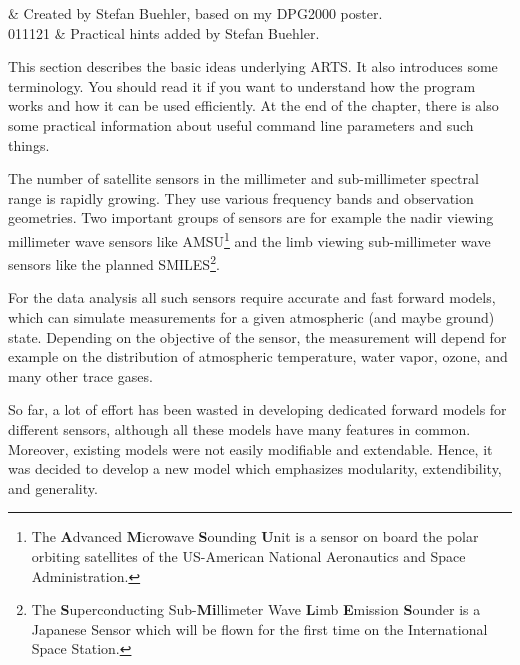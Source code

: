 %
%
 \label{sec:concept}

%
%
 & Created by Stefan Buehler, based on my DPG2000 poster.\\
  011121 & Practical hints added by Stefan Buehler.
\stophistory

%
%
%

%
%
This section describes the basic ideas underlying ARTS. It also
introduces some terminology. You should read it if you want
to understand how the program works and how it can be used
efficiently. At the end of the chapter, there is also some practical
information about useful command line parameters and such things. 


\label{sec:concept:intro}

The number of satellite sensors in the millimeter and sub-millimeter
spectral range is rapidly growing. They use various frequency
bands and observation geometries. Two important groups of
sensors are for example the nadir viewing millimeter wave
sensors like AMSU\footnote{The \textbf{A}dvanced
  \textbf{M}icrowave \textbf{S}ounding \textbf{U}nit is a
  sensor on board the polar orbiting satellites of the
  US-American National Aeronautics and Space Administration.}
and the limb viewing sub-millimeter wave sensors like the
planned SMILES\footnote{The \textbf{S}uperconducting
  Sub-\textbf{Mi}llimeter Wave \textbf{L}imb \textbf{E}mission
  \textbf{S}ounder is a Japanese Sensor which will be flown
  for the first time on the International Space Station.}.

For the data analysis all such sensors require accurate and
fast forward models, which can simulate measurements for a
given atmospheric (and maybe ground) state. Depending on the
objective of the sensor, the measurement will depend for
example on the distribution of atmospheric temperature, water
vapor, ozone, and many other trace gases.

So far, a lot of effort has been wasted in developing
dedicated forward models for different sensors, although all
these models have many features in common. Moreover, existing
models were not easily modifiable and extendable. Hence, it
was decided to develop a new model which emphasizes
modularity, extendibility, and generality.


